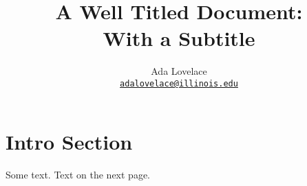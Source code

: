 \documentclass[letterpaper]{article}
\author{Ada Lovelace
        \\ \href{mailto:adalovelace@illinois.edu}{\texttt{adalovelace@illinois.edu}}
}
\date{}
\title{A Well Titled Document:\\
With a Subtitle}
\begin{document}
\maketitle
\section{Intro Section}
Some text.
\pagebreak
Text on the next page.


\end{document}
